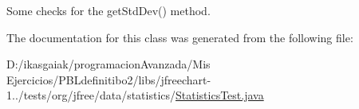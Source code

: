 Some checks for the get\+Std\+Dev() method. 

The documentation for this class was generated from the following file\+:\begin{DoxyCompactItemize}
\item 
D\+:/ikasgaiak/programacion\+Avanzada/\+Mis Ejercicios/\+P\+B\+Ldefinitibo2/libs/jfreechart-\/1../tests/org/jfree/data/statistics/\mbox{\hyperlink{_statistics_test_8java}{Statistics\+Test.\+java}}\end{DoxyCompactItemize}
